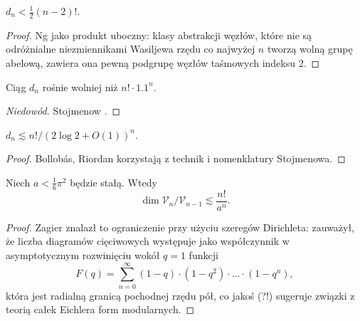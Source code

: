 \begin{proposition}
    $d_n < \frac 12 (n-2)!$.
\end{proposition}

\begin{proof}
%
    Ng \cite{ng98} jako produkt uboczny: klasy abstrakcji węzłów, które nie są odróżnialne niezmiennikami Wasiljewa rzędu co najwyżej $n$ tworzą wolną grupę abelową, zawiera ona pewną podgrupę węzłów taśmowych indeksu 2.
\end{proof}

\begin{proposition}
    Ciąg $d_n$ rośnie wolniej niż $n! \cdot 1.1
    ^n$.
\end{proposition}

\begin{proof}[Niedowód]
%
    Stojmenow \cite{stoimenow98}.
\end{proof}

\begin{proposition}
    $d_n \lesssim n! / (2 \log 2 + O(1))^n$.
\end{proposition}

\begin{proof}
%
%
    Bollobás, Riordan \cite{bollobas00} korzystają z technik i nomenklatury Stojmenowa.
\end{proof}

\begin{proposition}
    Niech $a < \frac 1 6 \pi^2$ będzie stałą.
    Wtedy
    \begin{equation}
        \dim \mathcal V_n / \mathcal V_{n-1} \lesssim \frac{n!}{a^n}.
    \end{equation}
\end{proposition}

\begin{proof}
%
%
    Zagier \cite{zagier01} znalazł to ograniczenie przy użyciu szeregów Dirichleta: zauważył, że liczba diagramów cięciwowych występuje jako współczynnik w asymptotycznym rozwinięciu wokół $q = 1$ funkcji
    \begin{equation}
        F(q) = \sum_{n=0}^\infty (1-q) \cdot (1-q^2) \cdot \ldots \cdot (1-q^n),
    \end{equation}
    która jest radialną granicą pochodnej rzędu pół, co jakoś (?!) sugeruje związki z teorią całek Eichlera form modularnych.
\end{proof}

